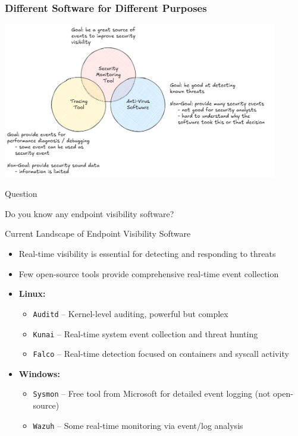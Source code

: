 \documentclass[12pt,aspectratio=169, colorlinks=true, linkcolor=circlBlue]{beamer}
\begin{document}
\begin{frame}
	\frametitle{Different Software for Different Purposes}
	\begin{center}
		\includegraphics[width=0.9\textwidth]{img/different-tools.png}
	\end{center}
\end{frame}

\begin{frame}{Question}
	\begin{center}
		\Huge{Do you know any endpoint visibility software?}
	\end{center}
\end{frame}

\begin{frame}{Current Landscape of Endpoint Visibility Software}
	\begin{itemize}
		\item Real-time visibility is essential for detecting and responding to threats
		\item Few open-source tools provide comprehensive real-time event collection
		\item \textbf{Linux:}
		      \begin{itemize}
			      \item \texttt{Auditd} – Kernel-level auditing, powerful but complex
			      \item \texttt{Kunai} – Real-time system event collection and threat hunting
			      \item \texttt{Falco} – Real-time detection focused on containers and syscall activity
		      \end{itemize}
		\item \textbf{Windows:}
		      \begin{itemize}
			      \item \texttt{Sysmon} – Free tool from Microsoft for detailed event logging (not open-source)
			      \item \texttt{Wazuh} – Some real-time monitoring via event/log analysis
		      \end{itemize}
	\end{itemize}
\end{frame}
\end{document}
